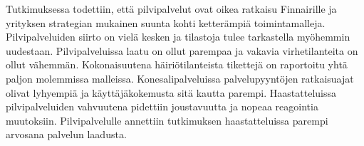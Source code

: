 Tutkimuksessa todettiin, että pilvipalvelut ovat oikea ratkaisu Finnairille ja yrityksen strategian mukainen suunta kohti ketterämpiä toimintamalleja. Pilvipalveluiden siirto on vielä kesken ja tilastoja tulee tarkastella myöhemmin uudestaan. Pilvipalveluissa laatu on ollut parempaa ja vakavia virhetilanteita on ollut vähemmän. Kokonaisuutena häiriötilanteista tikettejä on raportoitu yhtä paljon molemmissa malleissa. Konesalipalveluissa palvelupyyntöjen ratkaisuajat olivat lyhyempiä ja käyttäjäkokemusta sitä kautta parempi. Haastatteluissa pilvipalveluiden vahvuutena pidettiin joustavuutta ja nopeaa reagointia muutoksiin. Pilvipalvelulle annettiin tutkimuksen haastatteluissa parempi arvosana palvelun laadusta.  
